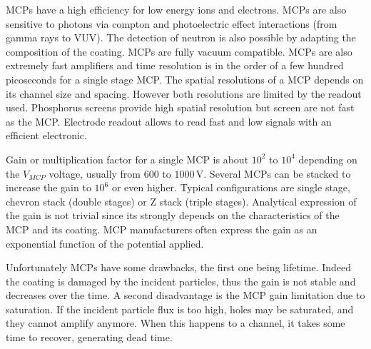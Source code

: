 \begin{refsection}
  MCPs have a high efficiency for low energy ions and electrons. MCPs are also sensitive to photons via compton and photoelectric effect interactions (from gamma rays to VUV). The detection of neutron is  also possible by adapting the composition of the coating. MCPs are fully vacuum compatible. MCPs are also extremely fast amplifiers and time resolution is in the order of a few hundred picoseconds for a single stage MCP. The spatial resolutions of a MCP depends on its channel size and spacing. However both resolutions are limited by the readout used. Phosphorus screens provide high spatial resolution but screen are not fast as the MCP. Electrode readout allows to read fast and low signals with an efficient electronic. 

  

  Gain or multiplication factor for a single MCP is about $10^{2}$ to $10^{4}$ depending on the $V_{MCP}$ voltage, usually from $600$ to $1000\,\mathrm{V}$. Several MCPs can be stacked to increase the gain to $10^{6}$ or even higher. Typical configurations are single stage, chevron stack (double stages) or Z stack (triple stages). Analytical expression of the gain is not trivial since its strongly depends on the characteristics of the MCP and its coating. MCP manufacturers often express the gain as an exponential function of the potential applied.

  

  Unfortunately MCPs have some drawbacks, the first one being lifetime. Indeed the coating is damaged by the incident particles, thus the gain is not stable and decreases over the time. A second disadvantage is the MCP gain limitation due to saturation. If the incident particle flux is too high, holes may be saturated, and they cannot amplify anymore. When this happens to a channel, it takes some time to recover, generating dead time.



\end{refsection}
